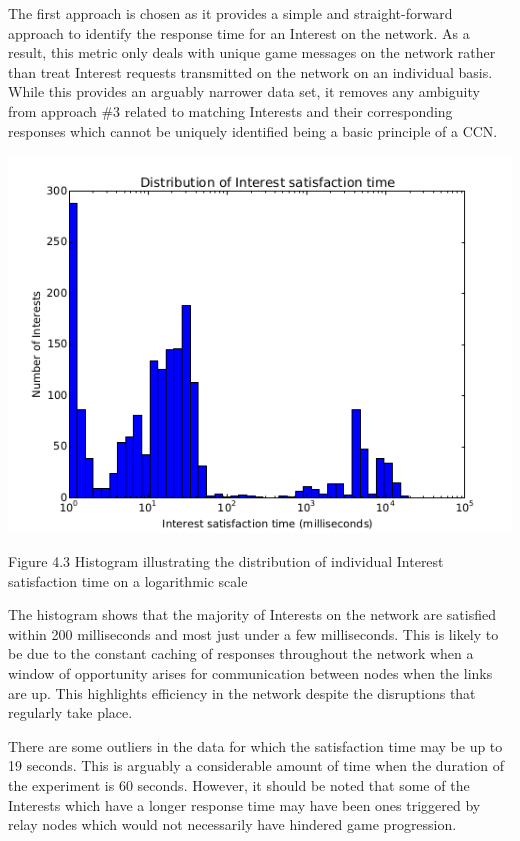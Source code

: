 \documentclass[a4paper,12pt]{report}      %
\begin{document}
\begin{descripton}
The first approach is chosen as it provides a simple and straight-forward approach to identify the
response time for an Interest on the network. As a result, this metric only deals with unique game
messages on the network rather than treat Interest requests transmitted on the network on an individual
basis. While this provides an arguably narrower data set, it removes any ambiguity from approach \#3
related to matching Interests and their corresponding responses which cannot be uniquely identified
being a basic principle of a CCN.

\includegraphics[scale=0.73]{InterestResponseTimeHist.jpg}

\begin{center}Figure 4.3 Histogram illustrating the distribution of individual Interest satisfaction time on a logarithmic scale\end{center}

The histogram shows that the majority of Interests on the network are satisfied within 200 milliseconds
and most just under a few milliseconds. This is likely to be due to the constant caching of responses
throughout the network when a window of opportunity arises for communication between nodes when
the links are up. This highlights efficiency in the network despite the disruptions that regularly take
place.

There are some outliers in the data for which the satisfaction time may be up to 19 seconds. This is
arguably a considerable amount of time when the duration of the experiment is 60 seconds. However, it
should be noted that some of the Interests which have a longer response time may have been ones
triggered by relay nodes which would not necessarily have hindered game progression.


\end{descripton}
\end{document}
